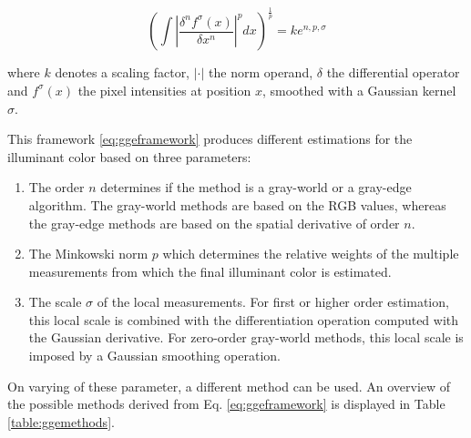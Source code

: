 \begin{equation}\label{eq:ggeframework}
\left( \int 	\left | \frac{\delta^n f^{\sigma}(x)}{\delta x^{n}} \right |^{p} dx \right)^{\frac{1}{p}} = k e ^{n, p, \sigma}
\end{equation}

where $k$ denotes a scaling factor, $|\cdot|$ the norm operand, $\delta$ the differential operator and $f^{\sigma}(x)$ the pixel intensities at position $x$, smoothed with a Gaussian kernel $\sigma$.

This framework \ref{eq:ggeframework} produces different estimations for the illuminant color based on three parameters:

\begin{enumerate}
\item The order $n$ determines if the method is a gray-world or a gray-edge algorithm. The gray-world methods are based on the RGB values, whereas the gray-edge methods are based on the spatial derivative of order $n$.
\item The Minkowski norm $p$ which determines the relative weights of the multiple measurements from which the final illuminant color is estimated.
\item The scale $\sigma$ of the local measurements. For first or higher order estimation, this local scale is combined with the differentiation operation computed with the Gaussian derivative. For zero-order gray-world methods, this local scale is imposed by a Gaussian smoothing operation.
\end{enumerate}

On varying of these parameter, a different method can be used. An overview of the possible methods derived from  Eq. \ref{eq:ggeframework} is displayed in Table \ref{table:ggemethods}.

